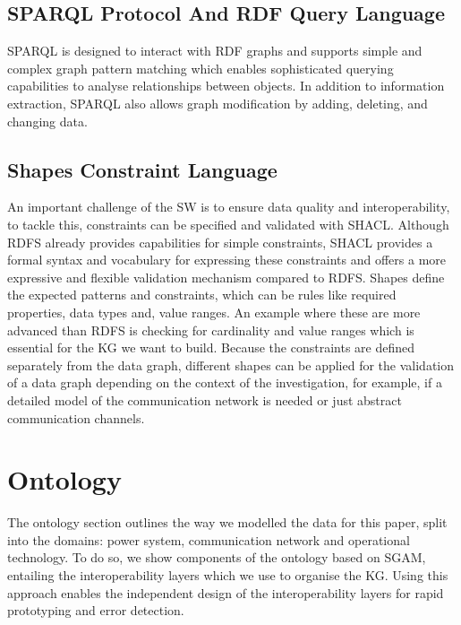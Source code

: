 \subsection{SPARQL Protocol And RDF Query Language}
\label{subsec:sparql}

\ac{SPARQL} is designed to interact with \ac{RDF} graphs and supports simple and complex graph pattern matching which enables sophisticated querying capabilities to analyse relationships between objects.
In addition to information extraction, \ac{SPARQL} also allows graph modification by adding, deleting, and changing data. 

\subsection{Shapes Constraint Language}
\label{subsec:shacl}

An important challenge of the \ac{SW} is to ensure data quality and interoperability, to tackle this, constraints can be specified and validated with \ac{SHACL}.
Although \ac{RDFS} already provides capabilities for simple constraints,  SHACL provides a formal syntax and vocabulary for expressing these constraints and offers a more expressive and flexible validation mechanism compared to \ac{RDFS}.
Shapes define the expected patterns and constraints, which can be rules like required properties, data types and, value ranges.
An example where these are more advanced than \ac{RDFS} is checking for cardinality and value ranges which is essential for the \ac{KG} we want to build.
Because the constraints are defined separately from the data graph, different shapes can be applied for the validation of a data graph depending on the context of the investigation, for example, if a detailed model of the communication network is needed or just abstract communication channels.

\section{Ontology}
\label{sec:data_model}

The ontology section outlines the way we modelled the data for this paper, split into the domains: power system, communication network and operational technology.
To do so, we show components of the ontology based on \ac{SGAM}, entailing the interoperability layers which we use to organise the \ac{KG}.
Using this approach enables the independent design of the interoperability layers for rapid prototyping and error detection.

